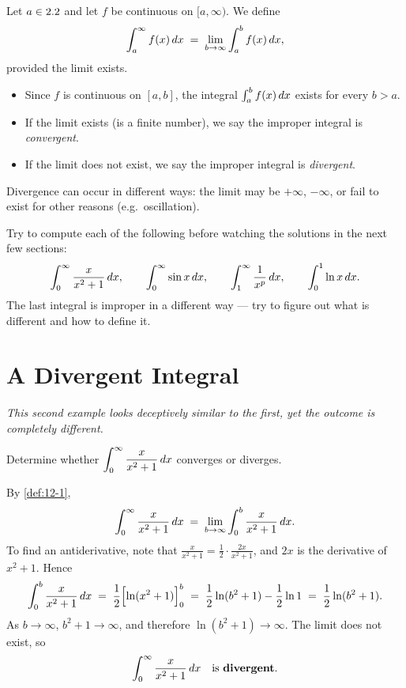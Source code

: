 \begin{definition}
\label{def:12-1}
Let $a\in2.2$ and let $f$ be continuous on $[a,\infty)$.  We define
\[
  \int_{a}^{\infty}f(x)\,dx \;=\; \lim_{b\to\infty}\int_{a}^{b}f(x)\,dx,
\]
provided the limit exists.
\begin{itemize}
  \item Since $f$ is continuous on $[a,b]$, the integral $\int_{a}^{b}f(x)\,dx$ exists for every $b>a$.
  \item If the limit exists (is a finite number), we say the improper integral is \emph{convergent}.
  \item If the limit does not exist, we say the improper integral is \emph{divergent}.
\end{itemize}
\end{definition}

\begin{remark}
Divergence can occur in different ways: the limit may be $+\infty$, $-\infty$, or fail to exist for other reasons (e.g.\ oscillation).
\end{remark}

\begin{remark}
Try to compute each of the following before watching the solutions in the next few sections:
\[
  \int_{0}^{\infty}\frac{x}{x^{2}+1}\,dx, \qquad
  \int_{0}^{\infty}\sin x\,dx, \qquad
  \int_{1}^{\infty}\frac{1}{x^{p}}\,dx, \qquad
  \int_{0}^{1}\ln x\,dx.
\]
The last integral is improper in a different way --- try to figure out what is different and how to define it.
\end{remark}

\section{A Divergent Integral}
\label{sec:12.2}

\textit{This second example looks deceptively similar to the first, yet the outcome is completely different.}

\begin{example}
\label{ex:12-2}
Determine whether $\displaystyle\int_{0}^{\infty}\frac{x}{x^{2}+1}\,dx$ converges or diverges.

By \cref{def:12-1},
\[
  \int_{0}^{\infty}\frac{x}{x^{2}+1}\,dx
  \;=\; \lim_{b\to\infty}\int_{0}^{b}\frac{x}{x^{2}+1}\,dx.
\]
To find an antiderivative, note that $\frac{x}{x^{2}+1} = \frac{1}{2}\cdot\frac{2x}{x^{2}+1}$, and $2x$ is the derivative of $x^{2}+1$.  Hence
\[
  \int_{0}^{b}\frac{x}{x^{2}+1}\,dx
  \;=\; \frac{1}{2}\Bigl[\ln(x^{2}+1)\Bigr]_{0}^{b}
  \;=\; \frac{1}{2}\ln(b^{2}+1) - \frac{1}{2}\ln 1
  \;=\; \frac{1}{2}\ln(b^{2}+1).
\]
As $b\to\infty$, $b^{2}+1\to\infty$, and therefore $\ln(b^{2}+1)\to\infty$.  The limit does not exist, so
\[
  \int_{0}^{\infty}\frac{x}{x^{2}+1}\,dx \quad\text{is \textbf{divergent}.}
\]
\end{example}

